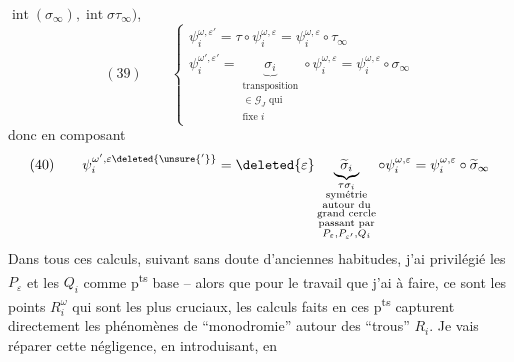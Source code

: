$\operatorname{int}(\sigma_\infty),\operatorname{int}\sigma\tau_\infty)$,
\[
(39)\qquad\begin{cases}
\psi_i^{\omega,\varepsilon'}=\tau\circ\psi_i^{\omega,\varepsilon}=\psi_i^{\omega,\varepsilon}\circ\tau_\infty\\[5pt]
\psi_i^{\omega',\varepsilon'}=\underbrace{\sigma_i}_{\substack{\text{transposition}\\\in\mathcal G_J\text{ qui}\\\text{fixe }i}}\circ\psi_i^{\omega,\varepsilon}=\psi_i^{\omega,\varepsilon}\circ\sigma_\infty
\end{cases}
\]
donc en composant
\[
(40)\qquad\psi_i^{\omega',\varepsilon\deleted{\unsure{'}}}=\deleted{\varepsilon}\underbrace{\widetilde\sigma_i}_{\substack{\tau\sigma_i\\\text{symétrie}\\\text{autour du}\\\text{grand cercle}\\\text{passant par}\\P_\varepsilon,P_{\varepsilon'},Q_i}}\circ\psi_i^{\omega,\varepsilon}=\psi_i^{\omega,\varepsilon}\circ\widetilde\sigma_\infty
\]
Dans tous ces calculs, suivant sans doute d'anciennes habitudes, j'ai privilégié les $P_\varepsilon$ et les $Q_i$ comme p\textsuperscript{ts} base -- alors que pour le travail que j'ai à faire, ce sont les points $R_i^\omega$ qui sont les plus cruciaux,  les calculs faits en ces p\textsuperscript{ts} capturent directement les phénomènes de ``monodromie'' autour des ``trous'' $R_i$. Je vais réparer cette négligence, en introduisant, en

